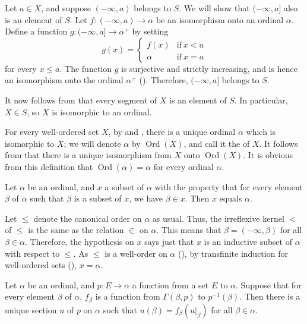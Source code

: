 \documentclass{article}
\begin{document}
Let \(a \in X\), and suppose \((-\infty, a)\) belongs to \(S\).  We
will show that \((-\infty, a]\) also is an element of \(S\).  Let
\(f : (-\infty, a) \to \alpha\) be an isomorphism onto an ordinal
\(\alpha\).  Define a function \(g : (-\infty, a] \to \alpha^+\) by
setting
\begin{displaymath}
  g(x) =
  \begin{cases}
    f(x) & \text{if} ~ x < a \\
    \alpha & \text{if} ~ x = a
  \end{cases}
\end{displaymath}
for every \(x \leq a\).  The function \(g\) is surjective and strictly
increasing, and is hence an isomorphism onto the ordinal \(\alpha^+\)
().  Therefore, \((-\infty, a]\) belongs to \(S\).

It now follows from  that every segment of \(X\) is
an element of \(S\).  In particular, \(X \in S\), so \(X\) is
isomorphic to an ordinal.

For every well-ordered set \(X\), by  and
, there is a unique ordinal \(\alpha\) which is
isomorphic to \(X\); we will denote \(\alpha\) by
\(\operatorname{Ord}(X)\), and call it the  of
\(X\).  It follows from  that there is a unique
isomorphism from \(X\) onto \(\operatorname{Ord}(X)\).  It is obvious
from this definition that \(\operatorname{Ord}(\alpha) = \alpha\) for
every ordinal \(\alpha\).

\begin{theorem}
  \label{thm:6ehprsvw}
  Let \(\alpha\) be an ordinal, and \(x\) a subset of \(\alpha\) with
  the property that for every element \(\beta\) of \(\alpha\) such
  that \(\beta\) is a subset of \(x\), we have \(\beta \in x\).  Then
  \(x\) equals \(\alpha\).
\end{theorem}

Let \(\leq\) denote the canonical order on \(\alpha\) as usual.  Thus,
the irreflexive kernel \(<\) of \(\leq\) is the same as the relation
\(\in\) on \(\alpha\).  This means that \(\beta = (-\infty, \beta)\)
for all \(\beta \in \alpha\).  Therefore, the hypothesis on \(x\) says
just that \(x\) is an inductive subset of \(\alpha\) with respect to
\(\leq\).  As \(\leq\) is a well-order on \(\alpha\)
(), by transfinite induction for well-ordered sets
(), \(x = \alpha\).

\begin{theorem}
  \label{thm:fa9kx7s9}
  Let \(\alpha\) be an ordinal, and \(p : E \to \alpha\) a function
  from a set \(E\) to \(\alpha\).  Suppose that for every element
  \(\beta\) of \(\alpha\), \(f_\beta\) is a function from
  \(\Gamma(\beta, p)\) to \(p^{-1}(\beta)\).  Then there is a unique
  section \(u\) of \(p\) on \(\alpha\) such that
  \(u(\beta) = f_\beta(u \vert_\beta)\) for all \(\beta \in \alpha\).
\end{theorem}
\end{document}
